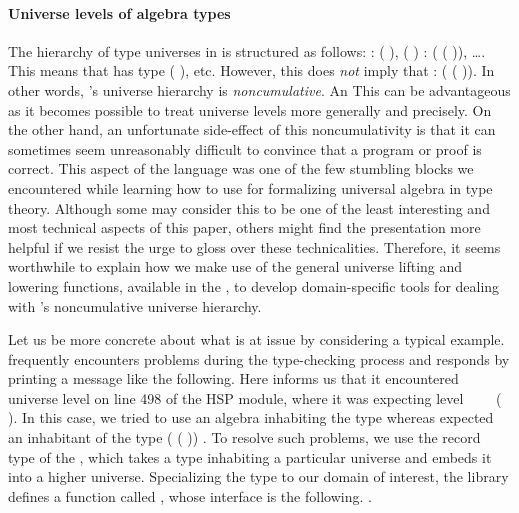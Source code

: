 \paragraph*{Universe levels of algebra types}
The hierarchy of type universes in \agda is structured as follows:
  :  ( ),  ( ) : 
( ( )), …. This means that   has type 
( ), etc.  However, this does \emph{not} imply that   :
 ( ( )). In other words, \agda's universe hierarchy is
\emph{noncumulative}.
\ifshort
An
\else
This can be advantageous as it becomes possible to treat universe
levels more generally and precisely. On the other hand, an
\fi
unfortunate side-effect of this noncumulativity is that it can sometimes seem unreasonably
difficult to convince \agda that a program or proof is correct.
\ifshort\else
This aspect of the language was one of the few stumbling
blocks we encountered while learning how to use \agda for formalizing universal algebra in
type theory. Although some may consider this to be one of the least interesting and most
technical aspects of this paper, others might find the presentation more helpful if we
resist the urge to gloss over these technicalities.
\fi
Therefore, it seems worthwhile to explain how we make use
of the general universe lifting and lowering functions, available in the \agdastdlib, to
develop domain-specific tools for dealing with \agda's noncumulative universe hierarchy.

\ifshort\else
Let us be more concrete about what is at issue by considering a typical example. \agda
frequently encounters problems during the type-checking process and responds by printing a
message like the following.
{\color{red}{\small
\begin{verbatim}
  HSP.lagda:498,20-23
  α != 𝓞 ⊔ 𝓥 ⊔ (lsuc α) when checking that... has type...
\end{verbatim}}}
\noindent Here \agda informs us that it encountered universe level  on line 498 of
the HSP module, where it was expecting level ~~~~(
). In this case, we tried to use an algebra inhabiting the type 
  whereas \agda expected an inhabitant of the type  (
   ( )) .
\fi
To resolve such problems, we use the  record type of the \agdastdlib,
which takes a type inhabiting a particular universe and embeds it into a higher universe.
Specializing the  type to our domain of interest, the \agdaalgebras library
defines a function called %
\ifshort
, whose interface is the following.
\vskip-2mm
\else
.

